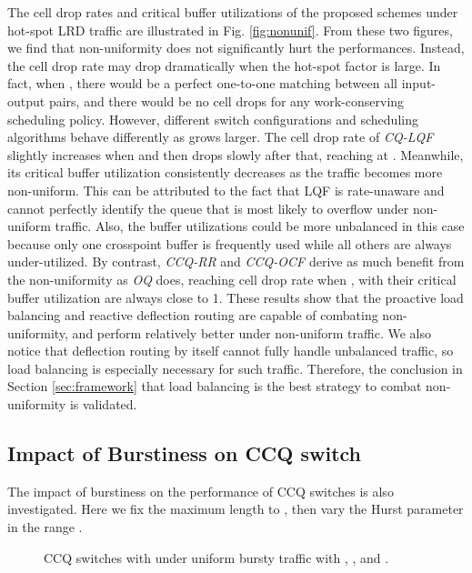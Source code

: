 \documentclass[journal,final,doublecolumn,10pt,twoside]{IEEEtranTCOM} \normalsize
\begin{document}
The cell drop rates and critical buffer utilizations of the proposed schemes under hot-spot LRD traffic are illustrated in Fig. \ref{fig:nonunif}. From these two figures, we find that non-uniformity does not significantly hurt the performances. Instead, the cell drop rate may drop dramatically when the hot-spot factor is large. In fact, when , there would be a perfect one-to-one matching between all input-output pairs, and there would be no cell drops for any work-conserving scheduling policy. However, different switch configurations and scheduling algorithms behave differently as  grows larger. The cell drop rate of \emph{CQ-LQF} slightly increases when  and then drops slowly after that, reaching  at . Meanwhile, its critical buffer utilization consistently decreases as the traffic becomes more non-uniform. This can be attributed to the fact that LQF is rate-unaware and cannot perfectly identify the queue that is most likely to overflow under non-uniform traffic. Also, the buffer utilizations could be more unbalanced in this case because only one crosspoint buffer is frequently used while all others are always under-utilized. By contrast, \emph{CCQ-RR} and \emph{CCQ-OCF} derive as much benefit from the non-uniformity as \emph{OQ} does, reaching  cell drop rate when , with their critical buffer utilization are always close to 1. These results show that the proactive load balancing and reactive deflection routing are capable of combating non-uniformity, and perform relatively better under non-uniform traffic. We also notice that deflection routing by itself cannot fully handle unbalanced traffic, so load balancing is especially necessary for such traffic. Therefore, the conclusion in Section \ref{sec:framework} that load balancing is the best strategy to combat non-uniformity is validated.



\subsection{Impact of Burstiness on CCQ switch}

The impact of burstiness on the performance of CCQ switches is also investigated. Here we fix the maximum length to , then vary the Hurst parameter in the range .



\begin{figure}[ht]
\begin{minipage}[t]{3.2 in}
\centering {}
\end{minipage}
\begin{minipage}[t]{3.2 in}
\centering {}
\end{minipage}
\caption{ CCQ switches with  under uniform bursty traffic with , , and .}
\label{fig:H}
\end{figure}
\end{document}
